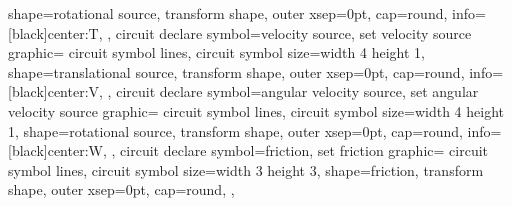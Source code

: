 {{    shape=rotational source,
    transform shape,
    outer xsep=0pt,
    cap=round,
    info={[black]center:\(\mathrm{T}\)},
  },
  circuit declare symbol=velocity source,
  set velocity source graphic={
    circuit symbol lines,
    circuit symbol size=width 4 height 1,
    shape=translational source,
    transform shape,
    outer xsep=0pt,
    cap=round,
    info={[black]center:\(\mathrm{V}\)},
  },
  circuit declare symbol=angular velocity source,
  set angular velocity source graphic={
    circuit symbol lines,
    circuit symbol size=width 4 height 1,
    shape=rotational source,
    transform shape,
    outer xsep=0pt,
    cap=round,
    info={[black]center:\(\mathrm{W}\)},
  },
  circuit declare symbol=friction,
  set friction graphic={
    circuit symbol lines,
    circuit symbol size=width 3 height 3,
    shape=friction,
    transform shape,
    outer xsep=0pt,
    cap=round,
  },
}

